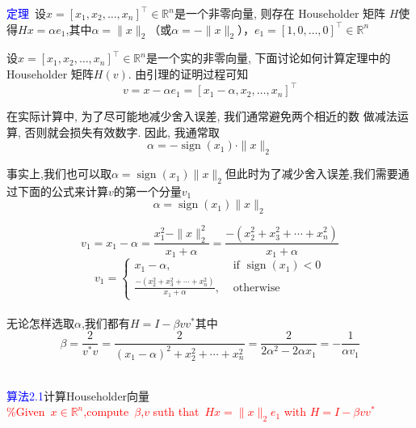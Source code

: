 \documentclass[notheorems,serif]{beamer}
\begin{document}
\begin{frame}
\noindent\textcolor{blue}{定理}~设$x=\left[x_{1}, x_{2}, \ldots,
x_{n}\right]^{\top} \in \mathbb{R}^{n}$是一个非零向量, 则存在 Householder 矩阵
$H$使得$Hx=\alpha e_1$,其中$\alpha=\|x\|_2$（或$\alpha=-\|x\|_2$），$e_1=[1,0, \ldots, 0]^{\top} \in \mathbb{R}^{n}$

设$x=\left[x_{1}, x_{2}, \ldots, x_{n}\right]^{\top} \in \mathbb{R}^{n}$是一个实的非零向量, 下面讨论如何计算定理中的 Householder 矩阵$H(v)$. 由引理的证明过程可知$$
v=x-\alpha e_{1}=\left[x_{1}-\alpha, x_{2}, \ldots, x_{n}\right]^{\top}
$$

在实际计算中, 为了尽可能地减少舍入误差, 我们通常避免两个相近的数
做减法运算, 否则就会损失有效数字. 因此, 我通常取$$
\alpha=-\operatorname{sign}\left(x_{1}\right) \cdot\|x\|_{2}
$$

事实上,我们也可以取$\alpha=\operatorname{sign}\left(x_{1}\right)\|x\|_{2}$但此时为了减少舍入误差,我们需要通过下面的公式来计算$v$的第一个分量$v_1$
$$
\alpha=\operatorname{sign}\left(x_{1}\right)\|x\|_{2}
$$
\end{frame}

\begin{frame}
$$
v_{1}=x_{1}-\alpha=\frac{x_{1}^{2}-\|x\|_{2}^{2}}{x_{1}+\alpha}=\frac{-\left(x_{2}^{2}+x_{3}^{2}+\cdots+x_{n}^{2}\right)}{x_{1}+\alpha}
$$
$$
v_{1}=\left\{\begin{array}{ll}{x_{1}-\alpha,} & {\text { if } \operatorname{sign}\left(x_{1}\right)<0} \\ {\frac{-\left(x_{2}^{2}+x_{3}^{2}+\cdots+x_{n}^{2}\right)}{x_{1}+\alpha},} & {\text { otherwise }}\end{array}\right.
$$\\无论怎样选取$\alpha$,我们都有$H=I-\beta v v^*$其中$$
\beta=\frac{2}{v^{*} v}=\frac{2}{\left(x_{1}-\alpha\right)^{2}+x_{2}^{2}+\cdots+x_{n}^{2}}=\frac{2}{2 \alpha^{2}-2 \alpha x_{1}}=-\frac{1}{\alpha v_{1}}
$$\\
\end{frame}

\newpage
\textcolor{blue}{算法2.1}计算Householder向量\\
\textcolor{red}{\%Given~$x \in \mathbb{R}^n$,compute~$\beta$,$v$ suth that~$Hx=\|x\|_{2} e_{1}$ with $H=I-\beta v v^*$}
\end{document}
